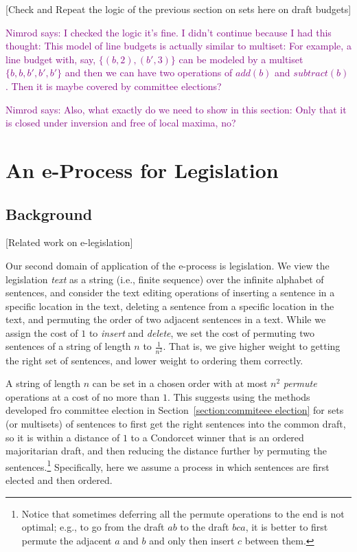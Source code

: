 \documentclass[sigconf]{aamas}  %
\newcommand{\nimrod}[1]{\textcolor{purple}{Nimrod says: #1}}
\begin{document}
[Check and Repeat the logic of the previous section on sets here on draft budgets]

\nimrod{I checked the logic it's fine. I didn't continue because I had this thought: This model of line budgets is actually similar to multiset: For example, a line budget with, say, $\{(b, 2), (b', 3)\}$ can be modeled by a multiset $\{b, b, b', b', b'\}$ and then we can have two operations of $add(b)$ and $subtract(b)$. Then it is maybe covered by committee elections?}

\nimrod{Also, what exactly do we need to show in this section: Only that it is closed under inversion and free of local maxima, no?}


\section{An e-Process for Legislation}
\label{section:e-process legislation}

\subsection{Background}

[Related work on e-legislation]

Our second domain of application of the e-process is legislation.
We view the legislation \emph{text} as a string (i.e., finite sequence) over the infinite alphabet of sentences, and consider the text editing operations of inserting a sentence in a specific location in the text, deleting a sentence from a specific location in the text, and permuting the order of two adjacent sentences in a text. While we assign the cost of $1$ to \emph{insert} and \emph{delete}, we set the cost of permuting two sentences of a string of length $n$ to $\frac{1}{n^2}$.  That is, we give higher weight to getting the right set of sentences, and lower weight to ordering them correctly. 

A string of length $n$ can be set in a chosen order with at most ${n^2}$ \emph{permute} operations at a cost of no more than $1$. This suggests using the methods developed fro committee election in Section~\ref{section:commiteee election} for sets (or multisets) of sentences to first get the right sentences into the common draft, so it is within a distance of $1$ to a Condorcet winner that is an ordered majoritarian draft, and then reducing the distance further by permuting the sentences.\footnote{
Notice that sometimes deferring all the permute operations to the end is not optimal; e.g., to go from the draft $ab$ to the draft $bca$, it is better to first permute the adjacent $a$ and $b$ and only then insert $c$ between them.} Specifically, here we assume a process in which sentences are first elected and then ordered.
\end{document}
